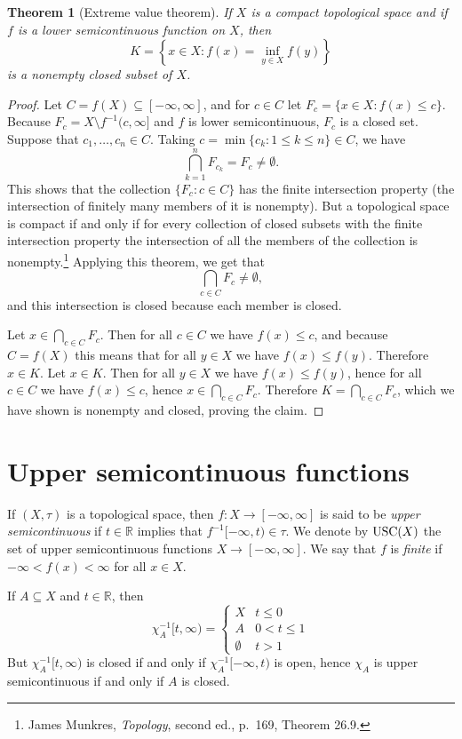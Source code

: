 \documentclass{article}
\newcommand{\USC}{\ensuremath\mathrm{USC}}
\newtheorem{theorem}{Theorem}
\theoremstyle{definition}
\begin{document}
\begin{theorem}[Extreme value theorem]
If $X$ is a compact topological space and if $f$ is a  lower semicontinuous function on $X$, then 
\[
K=\left\{x \in X: f(x) = \inf_{y \in X} f(y)\right\}
\]
is a nonempty closed subset of $X$.
\label{evt}
\end{theorem}
\begin{proof}
Let $C=f(X) \subseteq [-\infty,\infty]$, and for $c \in C$ let $F_c=\{x \in X: f(x) \leq c\}$. Because $F_c=X \setminus f^{-1}(c,\infty]$ and $f$ is lower
semicontinuous, $F_c$ is a closed set. Suppose that $c_1,\ldots,c_n \in C$. Taking $c=\min \{c_k: 1 \leq k \leq n\} \in C$,
we have
\[
\bigcap_{k=1}^n F_{c_k}  = F_c \neq \emptyset.
\]
This shows that the collection $\{F_c : c \in  C\}$ has the finite intersection property (the intersection of finitely many members of it is nonempty). But a topological space is compact if and only if for every collection
of closed subsets with the finite intersection property the intersection of all the members of the collection is nonempty.\footnote{James Munkres,
{\em Topology}, second ed., p.~169, Theorem 26.9.} Applying this theorem, we get that 
\[
\bigcap_{c \in C} F_c \neq \emptyset,
\]
and this intersection is closed because each member is closed.

Let $x \in \bigcap_{c \in C} F_c$. Then for all $c \in C$ we have
$f(x) \leq c$, and because $C=f(X)$ this means that for all $y \in X$ we have $f(x) \leq f(y)$. Therefore $x \in K$. Let
$x \in K$. Then for all $y \in X$ we have $f(x) \leq f(y)$, hence for all $c \in C$ we have $f(x) \leq c$, hence
$x \in \bigcap_{c \in C} F_c$. Therefore $K= \bigcap_{c \in C} F_c$, which we have shown is nonempty and closed, proving the claim.
\end{proof}


\section{Upper semicontinuous functions}
If $(X,\tau)$ is a topological space, then $f:X \to [-\infty,\infty]$ is said to be {\em upper semicontinuous} if $t \in \mathbb{R}$ implies that $f^{-1}[-\infty,t) \in 
\tau$. We denote by $\USC(X)$ the set of upper semicontinuous functions $X \to [-\infty,\infty]$. We say that $f$ is {\em finite} if $-\infty<f(x)<\infty$ for all $x \in X$. 


If $A \subseteq X$ and $t \in \mathbb{R}$, then
\[
\chi_A^{-1}[t,\infty)=\begin{cases}
X&t \leq 0\\
A&0<t \leq 1\\
\emptyset&t > 1
\end{cases}
\]
But $\chi_A^{-1}[t,\infty)$ is closed if and only if $\chi_A^{-1}[-\infty,t)$ is open, hence $\chi_A$ is upper semicontinuous if and only if 
$A$ is closed.
\end{document}

